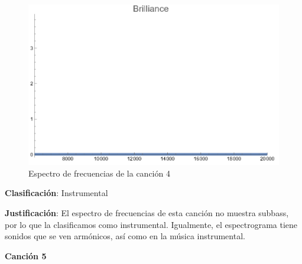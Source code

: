 \documentclass[12pt, letterpaper]{article}
\begin{document}
\begin{figure}[H]
\begin{minipage}{.3\textwidth}
  \end{minipage}
  \begin{minipage}{0.03\textwidth}\end{minipage}
  \begin{minipage}{.3\textwidth}
    \centering
    \includegraphics[width=.9\linewidth]{imgs/Cancion4/brilliance.png}
  \end{minipage}
  \caption{Espectro de frecuencias de la canción 4}
  \label{fig:esp04}
\end{figure}

\textbf{Clasificación}: Instrumental

\textbf{Justificación}: El espectro de frecuencias de esta canción no
muestra subbass, por lo que la clasificamos como instrumental. Igualmente,
el espectrograma tiene sonidos que se ven armónicos, así como en la música
instrumental.

\newpage

\textbf{\large{Canción 5}}
\end{document}
